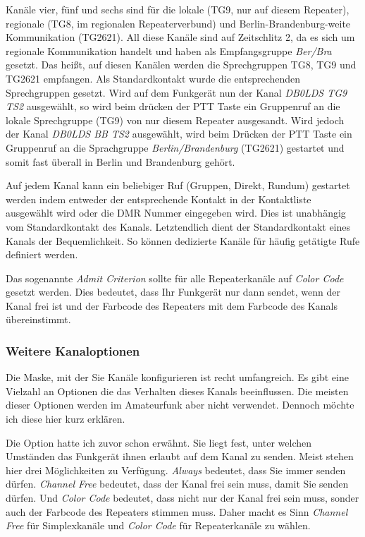 Kanäle vier, fünf und sechs sind für die lokale (TG9, nur auf diesem Repeater), regionale (TG8, im regionalen Repeaterverbund) und Berlin-Brandenburg-weite Kommunikation (TG2621). All diese Kanäle sind auf Zeitschlitz 2, da es sich um regionale Kommunikation handelt und haben als Empfangsgruppe \emph{Ber/Bra} gesetzt. Das heißt, auf diesen Kanälen werden die Sprechgruppen TG8, TG9 und TG2621 empfangen. Als Standardkontakt wurde die entsprechenden Sprechgruppen gesetzt. Wird auf dem Funkgerät nun der Kanal \emph{DB0LDS TG9 TS2} ausgewählt, so wird beim drücken der PTT Taste ein Gruppenruf an die lokale Sprechgruppe (TG9) von nur diesem Repeater ausgesandt. Wird jedoch der Kanal \emph{DB0LDS BB TS2} ausgewählt, wird beim Drücken der PTT Taste ein Gruppenruf an die Sprachgruppe \emph{Berlin/Brandenburg} (TG2621) gestartet und somit fast überall in Berlin und Brandenburg gehört.

\begin{merke}
 Auf jedem Kanal kann ein beliebiger Ruf (Gruppen, Direkt, Rundum) gestartet werden indem entweder der entsprechende Kontakt in der Kontaktliste ausgewählt wird oder die DMR Nummer eingegeben wird. Dies ist unabhängig vom Standardkontakt des Kanals. Letztendlich dient der Standardkontakt eines Kanals der Bequemlichkeit. So können dedizierte Kanäle für häufig getätigte Rufe definiert werden.
\end{merke}

Das sogenannte \emph{Admit Criterion} sollte für alle Repeaterkanäle auf \emph{Color Code} gesetzt werden. Dies bedeutet, dass Ihr Funkgerät nur dann sendet, wenn der Kanal frei ist und der Farbcode des Repeaters mit dem Farbcode des Kanals übereinstimmt.

\subsubsection{Weitere Kanaloptionen}
Die Maske, mit der Sie Kanäle konfigurieren ist recht umfangreich. Es gibt eine Vielzahl an Optionen die das Verhalten dieses Kanals beeinflussen. Die meisten dieser Optionen werden im Amateurfunk aber nicht verwendet. Dennoch möchte ich diese hier kurz erklären.

Die  Option hatte ich zuvor schon erwähnt. Sie liegt fest, unter welchen Umständen das Funkgerät ihnen erlaubt auf dem Kanal zu senden. Meist stehen hier drei Möglichkeiten zu Verfügung. \emph{Always} bedeutet, dass Sie immer senden dürfen. \emph{Channel Free} bedeutet, dass der Kanal frei sein muss, damit Sie senden dürfen. Und \emph{Color Code} bedeutet, dass nicht nur der Kanal frei sein muss, sonder auch der Farbcode des Repeaters stimmen muss. Daher macht es Sinn \emph{Channel Free} für Simplexkanäle und \emph{Color Code} für Repeaterkanäle zu wählen.

